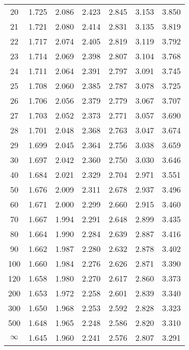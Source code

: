\documentclass[12pt]{article}
\begin{document}
\begin{table}
\begin{center}
{\begin{tabular}{|c|c|c|c|c|c|c|}
   20 &1.725& 2.086 &2.423 &  2.845 &  3.153 &3.850 \\
   21 &1.721 &  2.080 &  2.414& 2.831&3.135& 3.819\\
   22 & 1.717 &  2.074 &  2.405 &  2.819 &  3.119 &  3.792\\
23&  1.714 &  2.069 &  2.398 &  2.807 &  3.104 &  3.768\\
 24 & 1.711 &2.064 &2.391 &  2.797&   3.091&   3.745 \\
 25 & 1.708 &  2.060 &  2.385& 2.787 &3.078 &3.725 \\
 26 & 1.706 &  2.056 &  2.379 &  2.779 &  3.067 &3.707\\
  27 &1.703 &2.052 &2.373  & 2.771 &  3.057 &  3.690 \\
  28  &1.701& 2.048 &2.368 &  2.763 &3.047& 3.674 \\
  29 & 1.699 &  2.045 &  2.364 & 2.756 &3.038 &  3.659\\
   30 &1.697 &2.042 &2.360 &  2.750 &  3.030 &3.646 \\
   40 &1.684 &  2.021 &  2.329 &2.704 &2.971& 3.551\\
    50 & 1.676 &2.009 &2.311 &  2.678 &  2.937 &  3.496\\
     60 & 1.671& 2.000 &2.299 &2.660 &2.915 &  3.460\\
     70  &1.667 &  1.994  & 2.291 &  2.648 &  2.899 &  3.435\\
80 & 1.664 &  1.990 &  2.284 &  2.639 &  2.887 &  3.416\\
 90&  1.662& 1.987 &2.280 &  2.632 &  2.878 &  3.402\\
  100& 1.660 &  1.984 &  2.276& 2.626 &2.871 &3.390\\
   120 &1.658 &  1.980 &  2.270 &  2.617 &  2.860 &3.373\\
    200 &1.653 &1.972 &  2.258 &  2.601 &  2.839 &  3.340\\
     300 &1.650 &1.968& 2.253& 2.592 &2.828 &  3.323\\
      500 &1.648 &  1.965 &  2.248 &2.586 &2.820 &  3.310\\ \hline
      $\infty$ &   1.645 &  1.960 &  2.241 &  2.576 &  2.807 &
      3.291\\
  \hline
\end{tabular}
}
\end{center}
\end{table}

\end{document}
